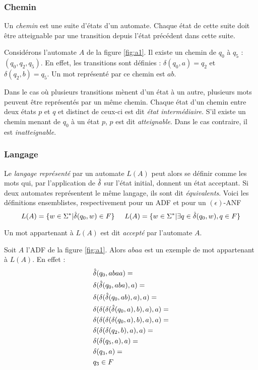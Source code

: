 \subsubsection*{Chemin}

Un \emph{chemin} est une suite d'états d'un automate. Chaque état de cette suite doit être atteignable par une transition depuis l'état précédent dans cette suite.

\begin{example}[Chemin]
 Considérons l'automate $A$ de la figure \ref{fig:a1}. Il existe un chemin de $q_0$ à $q_5$ : $(q_0,q_2,q_5)$. En effet, les transitions sont définies : $\delta(q_0, a)=q_2$ et $\delta(q_2, b)=q_5$. Un mot représenté par ce chemin est $ab$.
\end{example}

Dans le cas où plusieurs transitions mènent d'un état à un autre, plusieurs mots peuvent être représentés par un même chemin.
Chaque état d'un chemin entre deux états $p$ et $q$ et distinct de ceux-ci est dit \emph{état intermédiaire}. S'il existe un chemin menant de $q_0$ à un état $p$, $p$ est dit \emph{atteignable}. Dans le cas contraire, il est \emph{inatteignable}.

\subsubsection*{Langage}
Le \emph{langage représenté} par un automate \automaton $L(A)$ peut alors se définir comme les mots qui, par l'application de $\hat{\delta}$ sur l'état initial, donnent un état acceptant. Si deux automates représentent le même langage, ils sont dit \emph{équivalents}. Voici les définitions ensemblistes, respectivement pour un ADF et pour un $(\epsilon)$-ANF
$$
L(A)= \{w \in \Sigma^* | \hat{\delta}(q_0,w) \in F\} \hspace{0.5cm}
L(A)= \{w \in \Sigma^* | \exists q \in \hat{\delta}(q_0,w), q \in F\}
$$

Un mot appartenant à $L(A)$ est dit \emph{accepté} par l'automate $A$.


\begin{example}
  Soit $A$ l'ADF de la figure \ref{fig:a1}. Alors $abaa$ est un exemple de mot appartenant à $L(A)$. En effet :
  \begin{align*}
    &\hat{\delta}(q_0,abaa)=\\
    &\delta(\hat{\delta}(q_0,aba),a)=\\
    &\delta(\delta(\hat{\delta}(q_0,ab),a),a)=\\
    &\delta(\delta(\delta(\hat{\delta}(q_0,a),b),a),a)=\\
    &\delta(\delta(\delta(\delta(q_0,a),b),a),a)=\\
    &\delta(\delta(\delta(q_2,b),a),a)=\\
    &\delta(\delta(q_5,a),a)=\\
    &\delta(q_3,a)=\\
    &q_3 \in F
  \end{align*}
\end{example}

